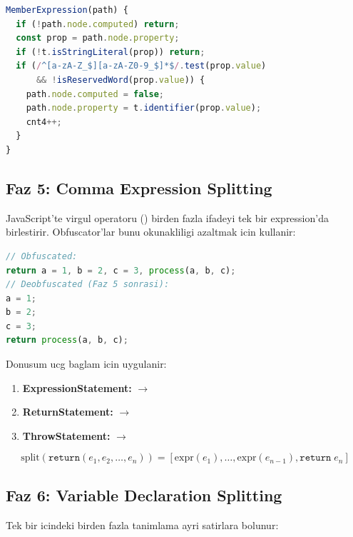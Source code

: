 \begin{lstlisting}[language=JavaScript, caption={Computed to static -- MemberExpression}]
MemberExpression(path) {
  if (!path.node.computed) return;
  const prop = path.node.property;
  if (!t.isStringLiteral(prop)) return;
  if (/^[a-zA-Z_$][a-zA-Z0-9_$]*$/.test(prop.value)
      && !isReservedWord(prop.value)) {
    path.node.computed = false;
    path.node.property = t.identifier(prop.value);
    cnt4++;
  }
}
\end{lstlisting}


\subsection{Faz 5: Comma Expression Splitting}
\label{sec:phase5-comma}

JavaScript'te virgul operatoru () birden fazla ifadeyi tek bir expression'da birlestirir. Obfuscator'lar bunu okunakliligi azaltmak icin kullanir:

\begin{lstlisting}[language=JavaScript]
// Obfuscated:
return a = 1, b = 2, c = 3, process(a, b, c);
// Deobfuscated (Faz 5 sonrasi):
a = 1;
b = 2;
c = 3;
return process(a, b, c);
\end{lstlisting}

Donusum ucg bag\-lam icin uygulanir:

\begin{enumerate}
\item \textbf{ExpressionStatement:}  $\to$ 
\item \textbf{ReturnStatement:}  $\to$ 
\item \textbf{ThrowStatement:}  $\to$ 
\end{enumerate}

\begin{equation}
\text{split}(\texttt{return}(e_1, e_2, \ldots, e_n)) = \left[\text{expr}(e_1), \ldots, \text{expr}(e_{n-1}), \texttt{return}\; e_n\right]
\end{equation}


\subsection{Faz 6: Variable Declaration Splitting}
\label{sec:phase6-vardecl}

Tek bir  icindeki birden fazla tanimlama ayri satirlara bolunur:

